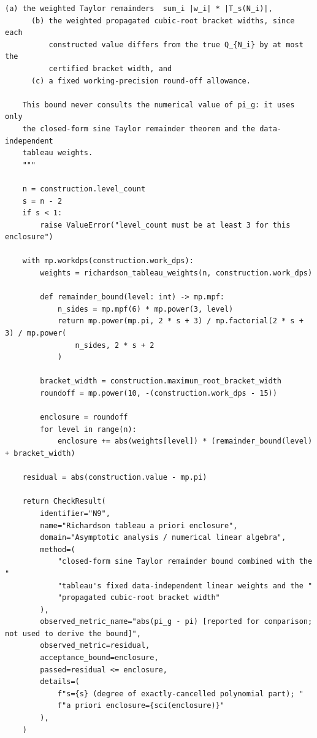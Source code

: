 \documentclass[11pt]{article}
\begin{document}
\begin{lstlisting}[style=pythonstyle,caption={\texttt{verify\_pi\_g\_identities.py}}]
      (a) the weighted Taylor remainders  sum_i |w_i| * |T_s(N_i)|,
      (b) the weighted propagated cubic-root bracket widths, since each
          constructed value differs from the true Q_{N_i} by at most the
          certified bracket width, and
      (c) a fixed working-precision round-off allowance.

    This bound never consults the numerical value of pi_g: it uses only
    the closed-form sine Taylor remainder theorem and the data-independent
    tableau weights.
    """

    n = construction.level_count
    s = n - 2
    if s < 1:
        raise ValueError("level_count must be at least 3 for this enclosure")

    with mp.workdps(construction.work_dps):
        weights = richardson_tableau_weights(n, construction.work_dps)

        def remainder_bound(level: int) -> mp.mpf:
            n_sides = mp.mpf(6) * mp.power(3, level)
            return mp.power(mp.pi, 2 * s + 3) / mp.factorial(2 * s + 3) / mp.power(
                n_sides, 2 * s + 2
            )

        bracket_width = construction.maximum_root_bracket_width
        roundoff = mp.power(10, -(construction.work_dps - 15))

        enclosure = roundoff
        for level in range(n):
            enclosure += abs(weights[level]) * (remainder_bound(level) + bracket_width)

    residual = abs(construction.value - mp.pi)

    return CheckResult(
        identifier="N9",
        name="Richardson tableau a priori enclosure",
        domain="Asymptotic analysis / numerical linear algebra",
        method=(
            "closed-form sine Taylor remainder bound combined with the "
            "tableau's fixed data-independent linear weights and the "
            "propagated cubic-root bracket width"
        ),
        observed_metric_name="abs(pi_g - pi) [reported for comparison; not used to derive the bound]",
        observed_metric=residual,
        acceptance_bound=enclosure,
        passed=residual <= enclosure,
        details=(
            f"s={s} (degree of exactly-cancelled polynomial part); "
            f"a priori enclosure={sci(enclosure)}"
        ),
    )



\end{lstlisting}
\end{document}
